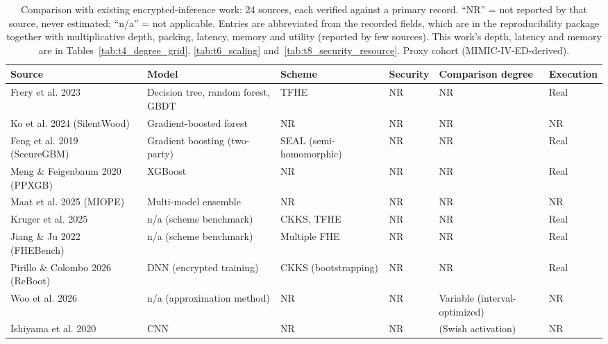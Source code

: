 \begin{table}[t]
\centering
\caption{Comparison with existing encrypted-inference work: 24 sources, each verified against a primary record. ``NR'' = not reported by that source, never estimated; ``n/a'' = not applicable. Entries are abbreviated from the recorded fields, which are in the reproducibility package together with multiplicative depth, packing, latency, memory and utility (reported by few sources). This work's depth, latency and memory are in Tables~\ref{tab:t4_degree_grid}, \ref{tab:t6_scaling} and~\ref{tab:t8_security_resource}. Proxy cohort (MIMIC-IV-ED-derived).}
\label{tab:t9_related_work}
\footnotesize
\setlength{\tabcolsep}{3pt}
\begin{tabular}{>{\raggedright\arraybackslash}p{}>{\raggedright\arraybackslash}p{}>{\raggedright\arraybackslash}p{}>{\raggedright\arraybackslash}p{}>{\raggedright\arraybackslash}p{}>{\raggedright\arraybackslash}p{}}
\toprule
Source & Model & Scheme & Security & Comparison degree & Execution \\
\midrule
Frery et al. 2023~\cite{frery2023tfhe} & Decision tree, random forest, GBDT & TFHE & NR & NR & Real \\
Ko et al. 2024 (SilentWood)~\cite{ko2024silentwood} & Gradient-boosted forest & NR & NR & NR & NR \\
Feng et al. 2019 (SecureGBM)~\cite{feng2019securegbm} & Gradient boosting (two-party) & SEAL (semi-homomorphic) & NR & NR & Real \\
Meng \& Feigenbaum 2020 (PPXGB)~\cite{meng2020ppxgboost} & XGBoost & NR & NR & NR & Real \\
Maat et al. 2025 (MIOPE)~\cite{maat2025miope} & Multi-model ensemble & NR & NR & NR & NR \\
Kruger et al. 2025~\cite{kruger2025ckkstfhe} & n/a (scheme benchmark) & CKKS, TFHE & NR & NR & Real \\
Jiang \& Ju 2022 (FHEBench)~\cite{jiang2022fhebench} & n/a (scheme benchmark) & Multiple FHE & NR & NR & Real \\
Pirillo \& Colombo 2026 (ReBoot)~\cite{pirillo2026reboot} & DNN (encrypted training) & CKKS (bootstrapping) & NR & NR & Real \\
Woo et al. 2026~\cite{woo2026degreeconstrained} & n/a (approximation method) & NR & NR & Variable (interval-optimized) & NR \\
Ishiyama et al. 2020~\cite{ishiyama2020cnnactivation} & CNN & NR & NR & 4 (Swish activation) & NR \\

\end{tabular}
\end{table}
